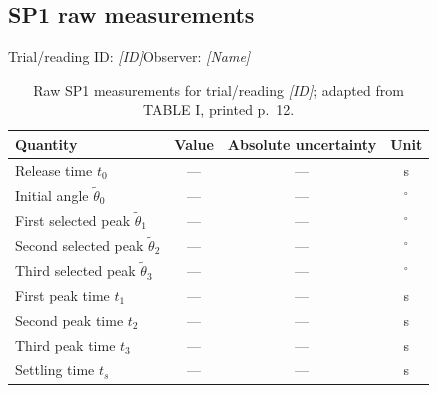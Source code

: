 \documentclass[11pt,a4paper]{article}
\newif\ifdraft
\DeclareRobustCommand{\guide}[1]{\ifdraft\par\smallskip\small\itshape Draft guidance: #1\par\smallskip\fi}
\newcommand{\manual}[1]{\cite[printed pp.~#1]{labmanual}}
\newcommand{\placeholder}[1]{\textit{[#1]}}
\begin{document}
\subsection{SP1 raw measurements}
Trial/reading ID: \placeholder{ID}\quad Observer: \placeholder{Name}
\begin{table}[htbp]
\centering
\caption{Raw SP1 measurements for trial/reading \placeholder{ID}; adapted from TABLE I, printed p.~12.}
\label{tab:rawsp1}
\begin{tabularx}{\linewidth}{@{}lccc@{}}
\toprule
Quantity & Value & Absolute uncertainty & Unit \\
\midrule
Release time $t_0$ & --- & --- & s \\
Initial angle $\tilde\theta_0$ & --- & --- & $^\circ$ \\
First selected peak $\tilde\theta_1$ & --- & --- & $^\circ$ \\
Second selected peak $\tilde\theta_2$ & --- & --- & $^\circ$ \\
Third selected peak $\tilde\theta_3$ & --- & --- & $^\circ$ \\
First peak time $t_1$ & --- & --- & s \\
Second peak time $t_2$ & --- & --- & s \\
Third peak time $t_3$ & --- & --- & s \\
Settling time $t_s$ & --- & --- & s \\
\bottomrule
\end{tabularx}
\end{table}
\guide{Also record initial direction, complete-oscillation count, visible cart motion, final position, additional peaks, and any limitations. At least three selected peaks must be in the same direction. Source: \manual{11}.}
\end{document}
